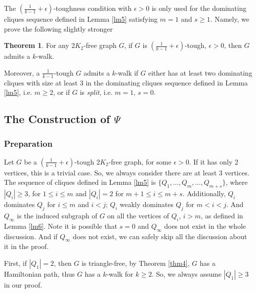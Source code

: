 \documentclass{amsart}
\theoremstyle{definition}
\newtheorem{theorem}{Theorem}
\begin{document}
The $(\frac{1}{k-1}+\epsilon)$-toughness condition with $\epsilon>0$ 
is only used for the dominating cliques sequence defined in Lemma \ref{lm5} 
satisfying $m=1$ and $s\geq 1$. Namely, we prove the following
slightly stronger
\begin{theorem}\label{opt}
For any $2K_2$-free graph $G$, if $G$ is $(\frac{1}{k-1}+\epsilon)$-tough, 
$\epsilon>0$, then $G$ admits a $k$-walk. 

Moreover, a $\frac{1}{k-1}$-tough $G$ admits a $k$-walk if $G$ either has at
least two dominating cliques with size at least 3 in the dominating cliques
sequence defined in Lemma \ref{lm5}, i.e. $m\ge2$, or if $G$ is {\em split},
i.e. $m=1$, $s=0$.  
\end{theorem}

\subsection{The Construction of $\Psi$} 

\subsubsection{Preparation}
Let $G$ be a $(\frac{1}{k-1}+\epsilon)$-tough $2K_2$-free graph, for some $\epsilon>0$. If it has only 2 vertices, this is a trivial case. So, we always consider there are at least 3 vertices. The sequence of cliques defined in Lemma \ref{lm5} is $\{Q_1,\ldots,Q_m,\ldots,Q_{m+s}\}$, where $|Q_i|\ge3$, for $1\le i\le m$ and $|Q_i|=2$ for $m+1\le i\le m+s$. Additionally, $Q_i$ dominates $Q_j$ for $i\le m$ and $i<j$; $Q_i$ weakly dominates $Q_j$ for $m<i<j$. And $Q_{\infty}$ is the induced subgraph of $G$ on all the vertices of $Q_i$, $i>m$, as defined in Lemma \ref{lm6}. Note it is possible that $s=0$ and $Q_{\infty}$ does not exist in the whole discussion. And if $Q_{\infty}$ does not exist, we can safely skip all the discussion about it in the proof.

First, if $|Q_1|=2$, then $G$ is triangle-free, by Theorem \ref{thm4}, $G$ has a Hamiltonian path, thus $G$ has a $k$-walk for $k\ge2$. So, we always assume $|Q_1|\ge3$ in our proof.
\end{document}

